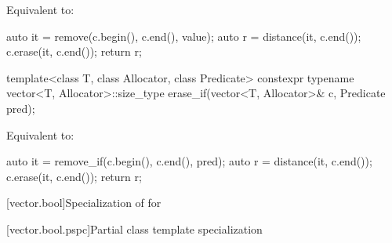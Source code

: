 \begin{itemdescr}
\pnum
\effects
Equivalent to:
\begin{codeblock}
auto it = remove(c.begin(), c.end(), value);
auto r = distance(it, c.end());
c.erase(it, c.end());
return r;
\end{codeblock}
\end{itemdescr}

%
\begin{itemdecl}
template<class T, class Allocator, class Predicate>
  constexpr typename vector<T, Allocator>::size_type
    erase_if(vector<T, Allocator>& c, Predicate pred);
\end{itemdecl}

\begin{itemdescr}
\pnum
\effects
Equivalent to:
\begin{codeblock}
auto it = remove_if(c.begin(), c.end(), pred);
auto r = distance(it, c.end());
c.erase(it, c.end());
return r;
\end{codeblock}
\end{itemdescr}

[vector.bool]{Specialization of  for }

[vector.bool.pspc]{Partial class template specialization }

